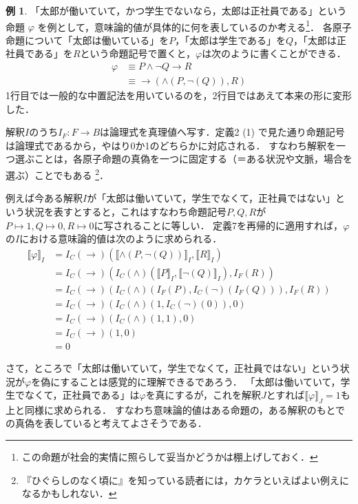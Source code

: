 \documentclass[uplatex,a4paper,dvipdfmx]{jsarticle}
\newcommand{\semvalue}[1]{\llbracket {#1} \rrbracket}
\theoremstyle{definition}
\newtheorem{example}{例}
\begin{document}
            \begin{example}
                「太郎が働いていて，かつ学生でないなら，太郎は正社員である」という命題 $\varphi$ を例として，意味論的値が具体的に何を表しているのか考える\footnote{この命題が社会的実情に照らして妥当かどうかは棚上げしておく．}．
                各原子命題について「太郎は働いている」を$P$，「太郎は学生である」を$Q$，「太郎は正社員である」を$R$という命題記号で置くと，$\varphi$は次のように書くことができる．
                \begin{align*}
                    \varphi &\equiv P \land \lnot Q \to R \\
                        &\equiv \to(\land(P, \lnot(Q)), R)
                \end{align*}
                1行目では一般的な中置記法を用いているのを，2行目ではあえて本来の形に変形した．

                解釈$I$のうち$I_F: F \to B$は論理式を真理値へ写す．定義2 (1) で見た通り命題記号は論理式であるから，やはり0か1のどちらかに対応される．
                すなわち解釈を一つ選ぶことは，各原子命題の真偽を一つに固定する（＝ある状況や文脈，場合を選ぶ）ことでもある
                \footnote{『ひぐらしのなく頃に』を知っている読者には，カケラといえばよい例えになるかもしれない．}．

                例えば今ある解釈$I$が「太郎は働いていて，学生でなくて，正社員ではない」という状況を表すとすると，これはすなわち命題記号$P, Q, R$が$P \mapsto 1, Q \mapsto 0, R \mapsto 0$に写されることに等しい．
                定義7を再帰的に適用すれば，$\varphi$の$I$における意味論的値は次のように求められる．
                \begin{align*}
                    \semvalue{\varphi}_I &= I_{C}(\to) (\semvalue{\land(P, \lnot(Q))}_I, \semvalue{R}_I) \\
                        &= I_{C}(\to) (I_{C}(\land)(\semvalue{P}_I, \semvalue{\lnot(Q)}_I), I_F(R)) \\
                        &= I_{C}(\to) (I_{C}(\land)(I_F(P), I_{C}(\lnot)(I_F(Q))), I_F(R)) \\
                        &= I_{C}(\to) (I_{C}(\land)(1, I_{C}(\lnot)(0)), 0) \\
                        &= I_{C}(\to) (I_{C}(\land)(1, 1), 0) \\
                        &= I_{C}(\to) (1, 0) \\
                        &= 0
                \end{align*}

                さて，ところで「太郎は働いていて，学生でなくて，正社員ではない」という状況が$\varphi$を偽にすることは感覚的に理解できるであろう．
                「太郎は働いていて，学生でなくて，正社員である」は$\varphi$を真にするが，これを解釈$J$とすれば$\semvalue{\varphi}_J = 1$も上と同様に求められる．
                すなわち意味論的値はある命題の，ある解釈のもとでの真偽を表していると考えてよさそうである．
            \end{example}
\end{document}
